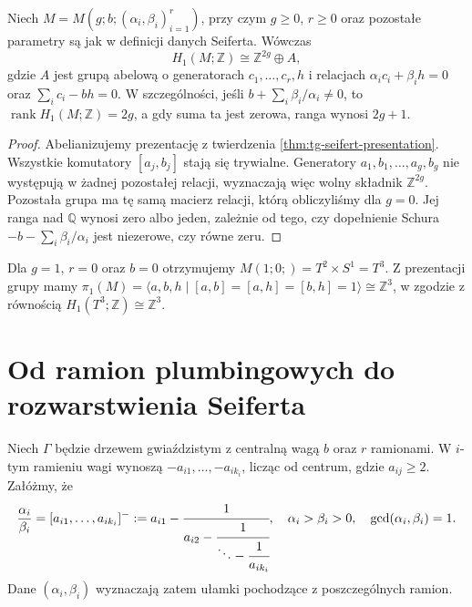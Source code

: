 \begin{wniosek}
\label{cor:tg-seifert-general-h1}
Niech $M=M(g;b;(\alpha_i,\beta_i)_{i=1}^r)$, przy czym
$g\geq0$, $r\geq0$ oraz pozostałe parametry są jak
w definicji danych Seiferta. Wówczas
\[
H_1(M;\mathbb Z)\cong\mathbb Z^{2g}\oplus A,
\]
gdzie $A$ jest grupą abelową o generatorach
$c_1,\ldots,c_r,h$ i relacjach
$\alpha_i c_i+\beta_i h=0$ oraz
$\sum_i c_i-bh=0$.
W szczególności, jeśli $b+\sum_i\beta_i/\alpha_i\ne0$,
to $\operatorname{rank}H_1(M;\mathbb Z)=2g$,
a gdy suma ta jest zerowa, ranga wynosi $2g+1$.
\end{wniosek}
\begin{proof}
Abelianizujemy prezentację z twierdzenia
\ref{thm:tg-seifert-presentation}. Wszystkie komutatory
$[a_j,b_j]$ stają się trywialne. Generatory
$a_1,b_1,\ldots,a_g,b_g$ nie występują w żadnej
pozostałej relacji, wyznaczają więc wolny składnik
$\mathbb Z^{2g}$. Pozostała grupa ma tę samą macierz
relacji, którą obliczyliśmy dla $g=0$.
Jej ranga nad $\mathbb Q$ wynosi zero albo jeden,
zależnie od tego, czy dopełnienie Schura
$-b-\sum_i\beta_i/\alpha_i$ jest niezerowe,
czy równe zeru.
\end{proof}

\begin{przyklad}
Dla $g=1$, $r=0$ oraz $b=0$ otrzymujemy
$M(1;0;)=T^2\times S^1=T^3$. Z prezentacji grupy
mamy $\pi_1(M)=\langle a,b,h\mid [a,b]=[a,h]=[b,h]=1\rangle
\cong\mathbb Z^3$, w zgodzie z równością
$H_1(T^3;\mathbb Z)\cong\mathbb Z^3$.
\end{przyklad}

\section{Od ramion plumbingowych do rozwarstwienia Seiferta}
\label{sec:tg-seifert-stars}

Niech $\Gamma$ będzie drzewem gwiaździstym z centralną
wagą $b$ oraz $r$ ramionami. W $i$-tym ramieniu wagi
wynoszą $-a_{i1},\ldots,-a_{ik_i}$, licząc od centrum,
gdzie $a_{ij}\ge2$. Załóżmy, że
\[
\frac{\alpha_i}{\beta_i}=
[a_{i1},\ldots,a_{ik_i}]^-
:=a_{i1}-\cfrac1{a_{i2}-\cfrac1{\ddots-\cfrac1{a_{ik_i}}}},
\quad \alpha_i>\beta_i>0,\quad\gcd(\alpha_i,\beta_i)=1.
\]
Dane $(\alpha_i,\beta_i)$ wyznaczają zatem ułamki
pochodzące z poszczególnych ramion.

